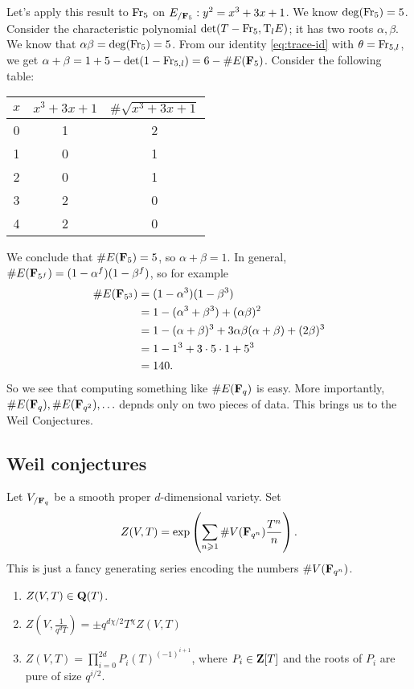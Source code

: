 Let's apply this result to $\operatorname{Fr}_5$ on $E_{/\mathbf{F}_5}:y^2=x^3+3 x+1$. We know 
$\deg(\operatorname{Fr}_5)=5$. Consider the characteristic polynomial 
$\det(T-\operatorname{Fr}_5,\mathrm{T}_l E)$; it has two roots $\alpha,\beta$. We know that 
$\alpha\beta=\deg(\operatorname{Fr}_5)=5$. From our identity \eqref{eq:trace-id} with 
$\theta=\operatorname{Fr}_{5,l}$, we get 
$\alpha+\beta=1+5-\det(1-\operatorname{Fr}_{5,l}) = 6-\# E(\mathbf{F}_5)$. Consider the following 
table: 
\begin{center}
\begin{tabular}{c|cc}
$x$ & $x^3+3 x+1$ & $\#\sqrt{x^3+3 x+1}$ \\ \hline
0 & 1 & 2 \\
1 & 0 & 1 \\
2 & 0 & 1 \\
3 & 2 & 0 \\
4 & 2 & 0 
\end{tabular}
\end{center}
We conclude that $\# E(\mathbf{F}_5)=5$, so $\alpha+\beta=1$. In general, 
$\#E(\mathbf{F}_{5^f}) = (1-\alpha^f)(1-\beta^f)$, so for example 
\begin{align*}
  \# E(\mathbf{F}_{5^3}) 
    &= (1-\alpha^3)(1-\beta^3) \\
    &= 1-(\alpha^3+\beta^3) + (\alpha\beta)^2 \\
    &= 1-(\alpha+\beta)^3 + 3\alpha\beta(\alpha+\beta) + (2\beta)^3 \\
    &= 1-1^3 + 3\cdot 5\cdot 1 + 5^3 \\
    &= 140 .
\end{align*}
So we see that computing something like $\# E(\mathbf{F}_q)$ is easy. More 
importantly, $\# E(\mathbf{F}_q),\# E(\mathbf{F}_{q^2}),\ldots$ depnds only on two pieces 
of data. This brings us to the Weil Conjectures. 





\subsection{Weil conjectures}

Let $V_{/\mathbf{F}_q}$ be a smooth proper $d$-dimensional variety. Set 
\[
  Z(V,T) = \exp\left(\sum_{n\geqslant 1} \# V(\mathbf{F}_{q^n}) \frac{T^n}{n}\right) .
\]
This is just a fancy generating series encoding the numbers $\# V(\mathbf{F}_{q^n})$. 

\begin{conjecture}[Weil]
\leavevmode
\begin{enumerate}
\item $Z(V,T)\in \mathbf{Q}(T)$. 
\item $Z\left(V,\displaystyle\frac{1}{q^d T}\right) = \pm q^{d\chi/2} T^\chi Z(V,T)$
\item $Z(V,T)=\prod_{i=0}^{2 d} P_i(T)^{(-1)^{i+1}}$, where $P_i\in \mathbf{Z}[T]$ and 
the roots of $P_i$ are pure of size $q^{i/2}$. 
\end{enumerate}
\end{conjecture}

